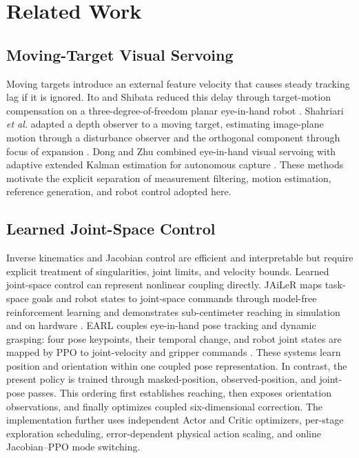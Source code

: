 \documentclass[conference]{IEEEtran}
\begin{document}
\section{Related Work}

\subsection{Moving-Target Visual Servoing}

Moving targets introduce an external feature velocity that causes steady tracking lag if it is ignored. Ito and Shibata reduced this delay through target-motion compensation on a three-degree-of-freedom planar eye-in-hand robot \cite{ito2009}. Shahriari \emph{et al.} adapted a depth observer to a moving target, estimating image-plane motion through a disturbance observer and the orthogonal component through focus of expansion \cite{shahriari2013}. Dong and Zhu combined eye-in-hand visual servoing with adaptive extended Kalman estimation for autonomous capture \cite{dong2016}. These methods motivate the explicit separation of measurement filtering, motion estimation, reference generation, and robot control adopted here.

\subsection{Learned Joint-Space Control}

Inverse kinematics and Jacobian control are efficient and interpretable but require explicit treatment of singularities, joint limits, and velocity bounds. Learned joint-space control can represent nonlinear coupling directly. JAiLeR maps task-space goals and robot states to joint-space commands through model-free reinforcement learning and demonstrates sub-centimeter reaching in simulation and on hardware \cite{kumar2021}. EARL couples eye-in-hand pose tracking and dynamic grasping: four pose keypoints, their temporal change, and robot joint states are mapped by PPO to joint-velocity and gripper commands \cite{huang2023earl}. These systems learn position and orientation within one coupled pose representation. In contrast, the present policy is trained through masked-position, observed-position, and joint-pose passes. This ordering first establishes reaching, then exposes orientation observations, and finally optimizes coupled six-dimensional correction. The implementation further uses independent Actor and Critic optimizers, per-stage exploration scheduling, error-dependent physical action scaling, and online Jacobian--PPO mode switching.
\end{document}
